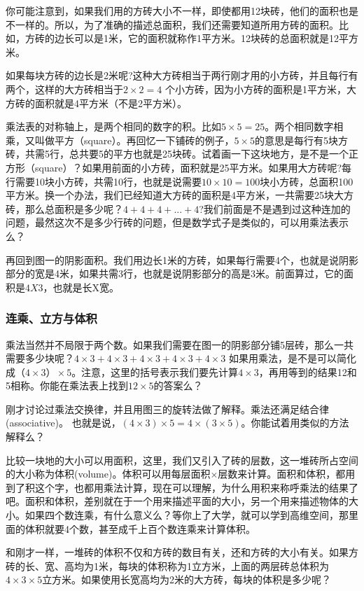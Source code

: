 你可能注意到，如果我们用的方砖大小不一样，即使都用12块砖，他们的面积也是不一样的。所以，为了准确的描述总面积，我们还需要知道所用方砖的面积。比如，方砖的边长可以是1米，它的面积就称作1平方米。12块砖的总面积就是12平方米。

如果每块方砖的边长是2米呢?这种大方砖相当于两行刚才用的小方砖，并且每行有两个，这样的大方砖相当于$2\times2 = 4$ 个小方砖，因为小方砖的面积是1平方米，大方砖的面积就是4平方米（不是2平方米）。

乘法表的对称轴上，是两个相同的数字的积。比如$5\times5 = 25$。两个相同数字相乘，又叫做平方（square）。再回忆一下铺砖的例子，$5\times5$的意思是每行有5块方砖，共需5行，总共要5的平方也就是25块砖。试着画一下这块地方，是不是一个正方形（square）？如果用前面的小方砖，面积就是25平方米。如果用大方砖呢?每行需要10块小方砖，共需10行，也就是说需要$10\times10=100$块小方砖，总面积100平方米。换一个办法，我们已经知道大方砖的面积是4平方米，一共需要25块大方砖，那么总面积是多少呢？$4+4+4+...+4$?我们前面是不是遇到过这种连加的问题，最然这次不是多少行砖的问题，但是数学式子是类似的，可以用乘法表示么？

再回到图一的阴影面积。我们用边长1米的方砖，如果每行需要4个，也就是说阴影部分的宽是4米，如果共需3行，也就是说阴影部分的高是3米。前面算过，它的面积是$4X3$，也就是长X宽。
\subsubsection{连乘、立方与体积}

乘法当然并不局限于两个数。如果我们需要在图一的阴影部分铺5层砖，那么一共需要多少块呢？$4\times3 + 4\times3 + 4\times3 + 4\times3 + 4\times3$ 如果用乘法，是不是可以简化成$（4\times3）\times5$。注意，这里的括号表示我们要先计算$4\times3$，再用等到的结果12和5相称。你能在乘法表上找到$12\times5$的答案么？

刚才讨论过乘法交换律，并且用图三的旋转法做了解释。乘法还满足结合律(associative)。 也就是说，$(4\times3)\times5 = 4\times(3\times5)$。你能试着用类似的方法解释么？

比较一块地的大小可以用面积，这里，我们又引入了砖的层数，这一堆砖所占空间的大小称为体积(volume)。体积可以用每层面积$\times$层数来计算。面积和体积，都用到了积这个字，也都用乘法计算，现在可以理解，为什么用积来称呼乘法的结果了吧。面积和体积，差别就在于一个用来描述平面的大小，另一个用来描述物体的大小。如果四个数连乘，有什么意义么？等你上了大学，就可以学到高维空间，那里面的体积就要4个数，甚至成千上百个数连乘来计算体积。

和刚才一样，一堆砖的体积不仅和方砖的数目有关，还和方砖的大小有关。如果方砖的长、宽、高均为1米，每块的体积称为1立方米，上面的两层砖总体积为$4\times3\times5$立方米。如果使用长宽高均为2米的大方砖，每块的体积是多少呢？


